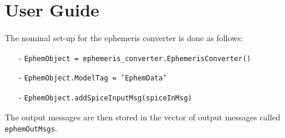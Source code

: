 \section{User Guide}

The nominal set-up for the ephemeris converter is done as follows:

\begin{itemize}
\item[-]     \texttt{EphemObject = ephemeris\_converter.EphemerisConverter()}
\item[-]     \texttt{EphemObject.ModelTag = 'EphemData'}
\item[-]     \texttt{EphemObject.addSpiceInputMsg(spiceInMsg)}
\end{itemize}
The output messages are then stored in the vector of output messages called {\tt ephemOutMsgs}.